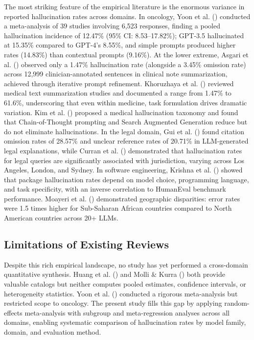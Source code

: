 \documentclass[
  11pt,
  a4paper,
]{article}
\begin{document}
The most striking feature of the empirical literature is the enormous
variance in reported hallucination rates across domains. In oncology,
Yoon et al. () conducted a meta-analysis of
39 studies involving 6,523 responses, finding a pooled hallucination
incidence of 12.47\% (95\% CI: 8.53--17.82\%); GPT-3.5 hallucinated at
15.35\% compared to GPT-4's 8.55\%, and simple prompts produced higher
rates (14.83\%) than contextual prompts (9.16\%). At the lower extreme,
Asgari et al. () observed only a 1.47\%
hallucination rate (alongside a 3.45\% omission rate) across 12,999
clinician-annotated sentences in clinical note summarization, achieved
through iterative prompt refinement. Khoruzhaya et al.
() reviewed medical text
summarization studies and documented a range from 1.47\% to 61.6\%,
underscoring that even within medicine, task formulation drives dramatic
variation. Kim et al. () proposed a medical
hallucination taxonomy and found that Chain-of-Thought prompting and
Search Augmented Generation reduce but do not eliminate hallucinations.
In the legal domain, Gui et al. () found
citation omission rates of 28.57\% and unclear reference rates of
20.71\% in LLM-generated legal explanations, while Curran et al.
() demonstrated that hallucination rates
for legal queries are significantly associated with jurisdiction,
varying across Los Angeles, London, and Sydney. In software engineering,
Krishna et al. () showed that package
hallucination rates depend on model choice, programming language, and
task specificity, with an inverse correlation to HumanEval benchmark
performance. Moayeri et al. ()
demonstrated geographic disparities: error rates were 1.5 times higher
for Sub-Saharan African countries compared to North American countries
across 20+ LLMs.

\subsection{Limitations of Existing
Reviews}\label{limitations-of-existing-reviews}

Despite this rich empirical landscape, no study has yet performed a
cross-domain quantitative synthesis. Huang et al.
() and Molli \& Kurra
() both provide valuable catalogs but
neither computes pooled estimates, confidence intervals, or
heterogeneity statistics. Yoon et al. ()
conducted a rigorous meta-analysis but restricted scope to oncology. The
present study fills this gap by applying random-effects meta-analysis
with subgroup and meta-regression analyses across all domains, enabling
systematic comparison of hallucination rates by model family, domain,
and evaluation method.
\end{document}
